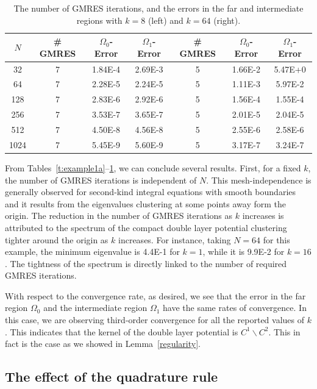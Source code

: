 \documentclass[final]{siamltex}
\begin{document}
\begin{table}[htps]
\begin{tabular}{c|ccc|ccc}
$N$ & \# GMRES & $\Omega_{0}$-Error & $\Omega_{1}$-Error 
    & \# GMRES & $\Omega_{0}$-Error & $\Omega_{1}$-Error \\
\hline
32   & 7 & 1.84E-4 & 2.69E-3  
     & 5 & 1.66E-2 & 5.47E+0 \\
64   & 7 & 2.28E-5 & 2.24E-5
     & 5 & 1.11E-3 & 5.97E-2 \\
128  & 7 & 2.83E-6 & 2.92E-6 
     & 5 & 1.56E-4 & 1.55E-4 \\
256  & 7 & 3.53E-7 & 3.65E-7  
     & 5 & 2.01E-5 & 2.04E-5 \\
512  & 7 & 4.50E-8 & 4.56E-8  
     & 5 & 2.55E-6 & 2.58E-6 \\
1024 & 7 & 5.45E-9 & 5.60E-9 
     & 5 & 3.17E-7 & 3.24E-7 \\
\end{tabular}
\caption{\label{t:example1c} The number of GMRES iterations, and the
errors in the far and intermediate regions with $k = 8$ (left) and
$k=64$ (right).}

\end{table}

From Tables~\ref{t:example1a}--\ref{t:example1c}, we can conclude
several results.  First, for a fixed $k$, the number of GMRES iterations
is independent of $N$.  This mesh-independence is generally observed for
second-kind integral equations with smooth boundaries and it results
from the eigenvalues clustering at some points away form the origin.
The reduction in the number of GMRES iterations as $k$ increases is
attributed to the spectrum of the compact double layer potential
clustering tighter around the origin as $k$ increases.  For instance,
taking $N=64$ for this example, the minimum eigenvalue is 4.4E-1 for
$k=1$, while it is 9.9E-2 for $k=16$.  The tightness of the spectrum is
directly linked to the number of required GMRES iterations.

With respect to the convergence rate, as desired, we see that the error
in the far region $\Omega_{0}$ and the intermediate region $\Omega_{1}$
have the same rates of convergence.  In this case, we are observing
third-order convergence for all the reported values of $k$.  This
indicates that the kernel of the double layer potential is $C^{1}
\backslash C^{2}$.  This in fact is the case as we showed in
Lemma~\ref{regularity}.



\subsection*{The effect of the quadrature rule}
\end{document}
